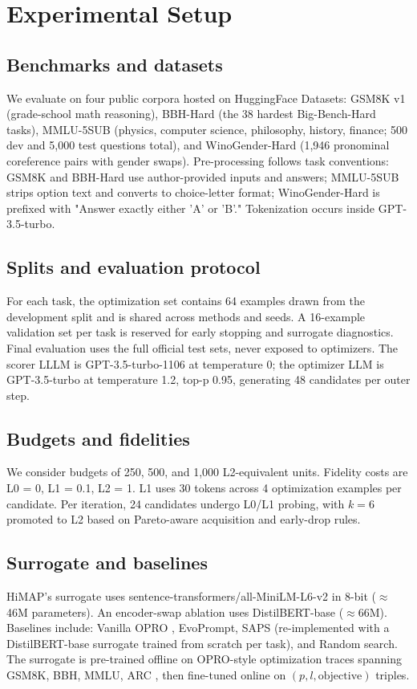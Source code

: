 \documentclass{article}
\begin{document}
\section{Experimental Setup}
\subsection{Benchmarks and datasets}
We evaluate on four public corpora hosted on HuggingFace Datasets: GSM8K v1 (grade-school math reasoning), BBH-Hard (the 38 hardest Big-Bench-Hard tasks), MMLU-5SUB (physics, computer science, philosophy, history, finance; 500 dev and 5,000 test questions total), and WinoGender-Hard (1,946 pronominal coreference pairs with gender swaps). Pre-processing follows task conventions: GSM8K and BBH-Hard use author-provided inputs and answers; MMLU-5SUB strips option text and converts to choice-letter format; WinoGender-Hard is prefixed with "Answer exactly either 'A' or 'B'." Tokenization occurs inside GPT-3.5-turbo.

\subsection{Splits and evaluation protocol}
For each task, the optimization set contains 64 examples drawn from the development split and is shared across methods and seeds. A 16-example validation set per task is reserved for early stopping and surrogate diagnostics. Final evaluation uses the full official test sets, never exposed to optimizers. The scorer LLLM is GPT-3.5-turbo-1106 at temperature 0; the optimizer LLM is GPT-3.5-turbo at temperature 1.2, top-p 0.95, generating 48 candidates per outer step.

\subsection{Budgets and fidelities}
We consider budgets of 250, 500, and 1,000 L2-equivalent units. Fidelity costs are L0 = 0, L1 = 0.1, L2 = 1. L1 uses 30 tokens across 4 optimization examples per candidate. Per iteration, 24 candidates undergo L0/L1 probing, with \(k = 6\) promoted to L2 based on Pareto-aware acquisition and early-drop rules.

\subsection{Surrogate and baselines}
HiMAP's surrogate uses sentence-transformers/all-MiniLM-L6-v2 in 8-bit (\(\approx\)46M parameters). An encoder-swap ablation uses DistilBERT-base (\(\approx\)66M). Baselines include: Vanilla OPRO \cite{yang-2023-large}, EvoPrompt, SAPS (re-implemented with a DistilBERT-base surrogate trained from scratch per task), and Random search. The surrogate is pre-trained offline on OPRO-style optimization traces spanning GSM8K, BBH, MMLU, ARC \cite{yang-2023-large}, then fine-tuned online on \((p, l, \text{objective})\) triples.
\end{document}
